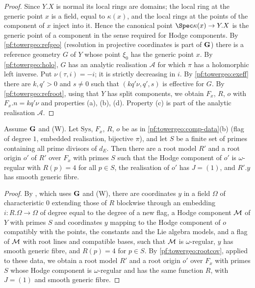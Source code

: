 \begin{proof}
Since $Y.X$ is normal its local rings are domains; the local ring at the generic point $x$ is a field, equal
to $\kappa(x)$, and the local rings at the points of the component of $x$ inject into it. Hence the
canonical point $\Spec\kappa(x)\to Y.X$ is the generic point of a component in the sense required for
Hodge components. By \cref{pf:towergeo:refgeo} (resolution in projective coordinates is part of $\mathbf G$)
there is a reference geometry $G$ of $Y$ whose point $\xi_0$ has the generic point $x$. By \cref{pf:towergeo:holo},
$G$ has an analytic realisation $\mathcal A$ for which $\pi$ has a holomorphic left inverse. Put $\nu(\tau,i)=-i$;
it is strictly decreasing in $i$. By \cref{pf:towergeo:exeff} there are $k,q'>0$ and $s\ne0$ such that
$(kq'\nu,q',s)$ is effective for $G$. By \cref{pf:towergeo:refroot}, using that $Y$ has split components, we
obtain $F_x$, $R$, $o$ with $F_x.n=kq'\nu$ and properties (a), (b), (d). Property (c) is part of the analytic
realisation $\mathcal A$.
\end{proof}

\begin{lemma}\label{pf:towergeo:level-data}
Assume $\mathbf G$ and \textup{(W)}. Let $\mathrm{Sys}$, $F_x$, $R$, $o$ be as in
\cref{pf:towergeo:comp-data}(b) (flag of degree $1$, embedded realisation, bijective $\pi$), and let $S$ be a
finite set of primes containing all prime divisors of $d_E$. Then there are a root model $R'$ and a root
origin $o'$ of $R'$ over $F_x$ with primes $S$ such that the Hodge component of $o'$ is $\omega$-regular
with $R(p)=4$ for all $p\in S$, the realisation of $o'$ has $J=(1)$, and $R'.y$ has smooth generic fibre.
\end{lemma}

\begin{proof}
By , which uses $\mathbf G$ and (W), there are
coordinates $y$ in a field $\Omega$ of characteristic $0$ extending those of $R$ blockwise through an
embedding $i\colon R.\Omega\to\Omega$ of degree equal to the degree of a new flag, a Hodge component
$\mathcal M$ of $Y$ with primes $S$ and coordinates $y$ mapping to the Hodge component of $o$ compatibly
with the points, the constants and the Lie algebra models, and a flag of $\mathcal M$ with root lines and
compatible bases, such that $\mathcal M$ is $\omega$-regular, $y$ has smooth generic fibre, and $R(p)=4$
for $p\in S$. By \cref{pf:towergeo:rootcov}, applied to these data, we obtain a root model $R'$ and a root origin
$o'$ over $F_x$ with primes $S$ whose Hodge component is $\omega$-regular and has the same function $R$, with
$J=(1)$ and smooth generic fibre.
\end{proof}

